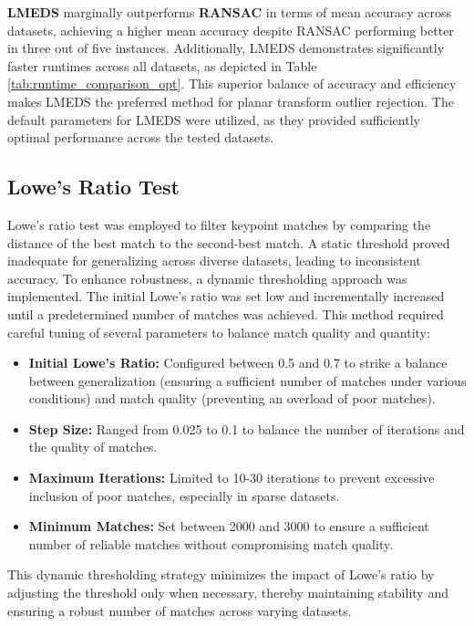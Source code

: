 \textbf{LMEDS} marginally outperforms \textbf{RANSAC} in terms of mean accuracy across datasets, achieving a higher mean accuracy despite RANSAC performing better in three out of five instances. Additionally, LMEDS demonstrates significantly faster runtimes across all datasets, as depicted in Table \ref{tab:runtime_comparison_opt}. This superior balance of accuracy and efficiency makes LMEDS the preferred method for planar transform outlier rejection. The default parameters for LMEDS were utilized, as they provided sufficiently optimal performance across the tested datasets.

\subsection{Lowe's Ratio Test}

Lowe's ratio test was employed to filter keypoint matches by comparing the distance of the best match to the second-best match. A static threshold proved inadequate for generalizing across diverse datasets, leading to inconsistent accuracy. To enhance robustness, a dynamic thresholding approach was implemented. The initial Lowe's ratio was set low and incrementally increased until a predetermined number of matches was achieved. This method required careful tuning of several parameters to balance match quality and quantity:

\begin{itemize}
    \item \textbf{Initial Lowe's Ratio:} Configured between 0.5 and 0.7 to strike a balance between generalization (ensuring a sufficient number of matches under various conditions) and match quality (preventing an overload of poor matches).
    \item \textbf{Step Size:} Ranged from 0.025 to 0.1 to balance the number of iterations and the quality of matches.
    \item \textbf{Maximum Iterations:} Limited to 10-30 iterations to prevent excessive inclusion of poor matches, especially in sparse datasets.
    \item \textbf{Minimum Matches:} Set between 2000 and 3000 to ensure a sufficient number of reliable matches without compromising match quality.
\end{itemize}

This dynamic thresholding strategy minimizes the impact of Lowe's ratio by adjusting the threshold only when necessary, thereby maintaining stability and ensuring a robust number of matches across varying datasets.

